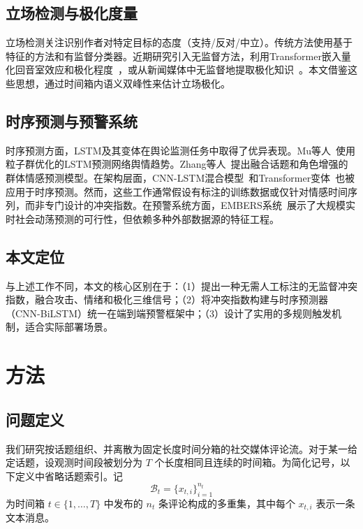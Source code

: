 \documentclass[conference]{IEEEtran}
\begin{document}
\subsection{立场检测与极化度量}

立场检测关注识别作者对特定目标的态度（支持/反对/中立）。传统方法使用基于特征的方法和有监督分类器。近期研究引入无监督方法，利用Transformer嵌入量化回音室效应和极化程度~\cite{ghafouri2024echo}，或从新闻媒体中无监督地提取极化知识~\cite{paschalides2025polar}。本文借鉴这些思想，通过时间箱内语义双峰性来估计立场极化。

\subsection{时序预测与预警系统}

时序预测方面，LSTM及其变体在舆论监测任务中取得了优异表现。Mu等人~\cite{Mu2023IPSO}使用粒子群优化的LSTM预测网络舆情趋势。Zhang等人~\cite{Zhang2024TRESP}提出融合话题和角色增强的群体情感预测模型。在架构层面，CNN-LSTM混合模型~\cite{Zhang2024TRESP}和Transformer变体~\cite{zhou2021informer}也被应用于时序预测。然而，这些工作通常假设有标注的训练数据或仅针对情感时间序列，而非专门设计的冲突指数。在预警系统方面，EMBERS系统~\cite{embers2025}展示了大规模实时社会动荡预测的可行性，但依赖多种外部数据源的特征工程。

\subsection{本文定位}

与上述工作不同，本文的核心区别在于：（1）提出一种无需人工标注的无监督冲突指数，融合攻击、情绪和极化三维信号；（2）将冲突指数构建与时序预测器（CNN-BiLSTM）统一在端到端预警框架中；（3）设计了实用的多规则触发机制，适合实际部署场景。

\section{方法}

\subsection{问题定义}

我们研究按话题组织、并离散为固定长度时间分箱的社交媒体评论流。对于某一给定话题，设观测时间段被划分为 $T$ 个长度相同且连续的时间箱。为简化记号，以下定义中省略话题索引。记
\[
\mathcal{B}_t = \{x_{t,i}\}_{i=1}^{n_t}
\]
为时间箱 $t \in \{1, \dots, T\}$ 中发布的 $n_t$ 条评论构成的多重集，其中每个 $x_{t,i}$ 表示一条文本消息。
\end{document}
